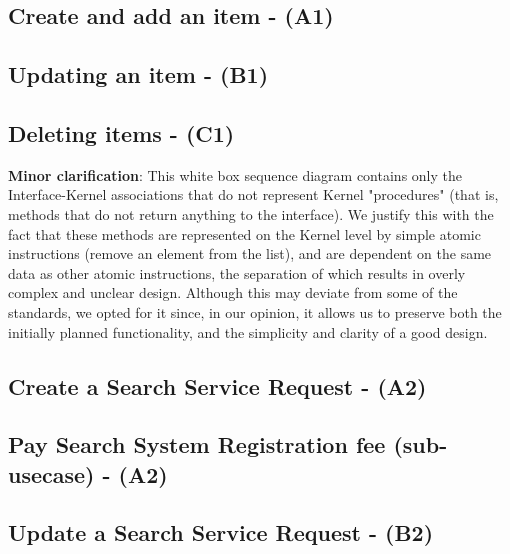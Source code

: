 \documentclass{article}
\begin{document}
\subsection{Create and add an item - (A1)}


% 

\newpage
\subsection{Updating an item - (B1)}



\newpage
\subsection{Deleting items - (C1)}



\textbf{Minor clarification}: This white box sequence diagram contains only the Interface-Kernel associations that do not represent Kernel "procedures" (that is, methods that do not return anything to the interface). We justify this with the fact that these methods are represented on the Kernel level by simple atomic instructions (remove an element from the list), and are dependent on the same data as other atomic instructions, the separation of which results in overly complex and unclear design. Although this may deviate from some of the standards, we opted for it since, in our opinion, it allows us to preserve both the initially planned functionality, and the simplicity and clarity of a good design. 

\newpage
\subsection{Create a Search Service Request - (A2)}

\subsection{Pay Search System Registration fee (sub-usecase) - (A2)}


\newpage
\subsection{Update a Search Service Request - (B2)}

\end{document}
